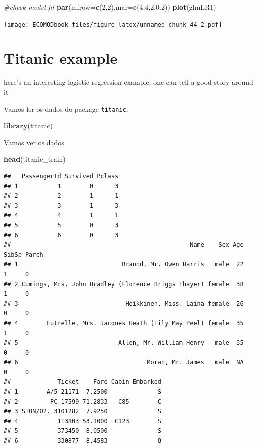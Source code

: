 \documentclass[
]{book}
\newenvironment{Shaded}{\begin{snugshade}}{\end{snugshade}}
\newcommand{\AttributeTok}[1]{\textcolor[rgb]{0.13,0.29,0.53}{#1}}
\newcommand{\CommentTok}[1]{\textcolor[rgb]{0.56,0.35,0.01}{\textit{#1}}}
\newcommand{\DecValTok}[1]{\textcolor[rgb]{0.00,0.00,0.81}{#1}}
\newcommand{\FloatTok}[1]{\textcolor[rgb]{0.00,0.00,0.81}{#1}}
\newcommand{\FunctionTok}[1]{\textcolor[rgb]{0.13,0.29,0.53}{\textbf{#1}}}
\newcommand{\NormalTok}[1]{#1}
\begin{document}
\begin{Shaded}
\begin{Highlighting}[]
\CommentTok{\#check model fit}
\FunctionTok{par}\NormalTok{(}\AttributeTok{mfrow=}\FunctionTok{c}\NormalTok{(}\DecValTok{2}\NormalTok{,}\DecValTok{2}\NormalTok{),}\AttributeTok{mar=}\FunctionTok{c}\NormalTok{(}\DecValTok{4}\NormalTok{,}\DecValTok{4}\NormalTok{,}\DecValTok{2}\NormalTok{,}\FloatTok{0.2}\NormalTok{))}
\FunctionTok{plot}\NormalTok{(glmLR1)}
\end{Highlighting}
\end{Shaded}

\texttt{[image: ECOMODbook\_files/figure-latex/unnamed-chunk-44-2.pdf]}

\section{Titanic example}\label{titanic-example}

here's an interesting logistic regression example, one can tell a good story around it

Vamos ler os dados do package \texttt{titanic}.

\begin{Shaded}
\begin{Highlighting}[]
\FunctionTok{library}\NormalTok{(titanic)}
\end{Highlighting}
\end{Shaded}

Vamos ver os dados

\begin{Shaded}
\begin{Highlighting}[]
\FunctionTok{head}\NormalTok{(titanic\_train)}
\end{Highlighting}
\end{Shaded}

\begin{verbatim}
##   PassengerId Survived Pclass
## 1           1        0      3
## 2           2        1      1
## 3           3        1      3
## 4           4        1      1
## 5           5        0      3
## 6           6        0      3
##                                                  Name    Sex Age SibSp Parch
## 1                             Braund, Mr. Owen Harris   male  22     1     0
## 2 Cumings, Mrs. John Bradley (Florence Briggs Thayer) female  38     1     0
## 3                              Heikkinen, Miss. Laina female  26     0     0
## 4        Futrelle, Mrs. Jacques Heath (Lily May Peel) female  35     1     0
## 5                            Allen, Mr. William Henry   male  35     0     0
## 6                                    Moran, Mr. James   male  NA     0     0
##             Ticket    Fare Cabin Embarked
## 1        A/5 21171  7.2500              S
## 2         PC 17599 71.2833   C85        C
## 3 STON/O2. 3101282  7.9250              S
## 4           113803 53.1000  C123        S
## 5           373450  8.0500              S
## 6           330877  8.4583              Q
\end{verbatim}
\end{document}
